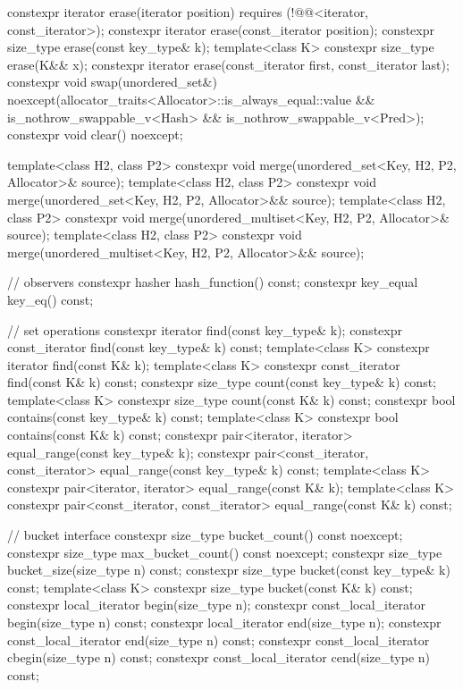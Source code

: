 \begin{codeblock}
{{    constexpr iterator  erase(iterator position)
      requires (!@@<iterator, const_iterator>);
    constexpr iterator  erase(const_iterator position);
    constexpr size_type erase(const key_type& k);
    template<class K> constexpr size_type erase(K&& x);
    constexpr iterator  erase(const_iterator first, const_iterator last);
    constexpr void      swap(unordered_set&)
      noexcept(allocator_traits<Allocator>::is_always_equal::value &&
               is_nothrow_swappable_v<Hash> && is_nothrow_swappable_v<Pred>);
    constexpr void      clear() noexcept;

    template<class H2, class P2>
      constexpr void merge(unordered_set<Key, H2, P2, Allocator>& source);
    template<class H2, class P2>
      constexpr void merge(unordered_set<Key, H2, P2, Allocator>&& source);
    template<class H2, class P2>
      constexpr void merge(unordered_multiset<Key, H2, P2, Allocator>& source);
    template<class H2, class P2>
      constexpr void merge(unordered_multiset<Key, H2, P2, Allocator>&& source);

    // observers
    constexpr hasher hash_function() const;
    constexpr key_equal key_eq() const;

    // set operations
    constexpr iterator         find(const key_type& k);
    constexpr const_iterator   find(const key_type& k) const;
    template<class K>
      constexpr iterator       find(const K& k);
    template<class K>
      constexpr const_iterator find(const K& k) const;
    constexpr size_type        count(const key_type& k) const;
    template<class K>
      constexpr size_type      count(const K& k) const;
    constexpr bool             contains(const key_type& k) const;
    template<class K>
      constexpr bool           contains(const K& k) const;
    constexpr pair<iterator, iterator>               equal_range(const key_type& k);
    constexpr pair<const_iterator, const_iterator>   equal_range(const key_type& k) const;
    template<class K>
      constexpr pair<iterator, iterator>             equal_range(const K& k);
    template<class K>
      constexpr pair<const_iterator, const_iterator> equal_range(const K& k) const;

    // bucket interface
    constexpr size_type bucket_count() const noexcept;
    constexpr size_type max_bucket_count() const noexcept;
    constexpr size_type bucket_size(size_type n) const;
    constexpr size_type bucket(const key_type& k) const;
    template<class K> constexpr size_type bucket(const K& k) const;
    constexpr local_iterator begin(size_type n);
    constexpr const_local_iterator begin(size_type n) const;
    constexpr local_iterator end(size_type n);
    constexpr const_local_iterator end(size_type n) const;
    constexpr const_local_iterator cbegin(size_type n) const;
    constexpr const_local_iterator cend(size_type n) const;

}}
\end{codeblock}
